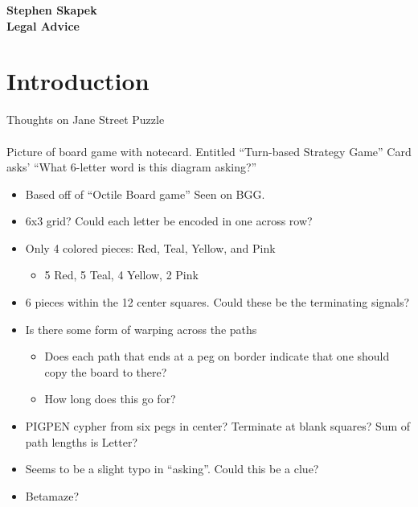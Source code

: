 \documentclass[11pt]{article}
\begin{document}
\begin{flushright}
\textbf{Stephen Skapek\\Legal Advice}
\end{flushright}
\section*{Introduction}
Thoughts on Jane Street Puzzle\\
\\
Picture of board game with notecard.
Entitled ``Turn-based Strategy Game''
Card asks' ``What 6-letter word is this diagram asking?''
\begin{itemize}
\item Based off of ``Octile Board game'' Seen on BGG.
\item 6x3 grid? Could each letter be encoded in one across row?
\item Only 4 colored pieces: Red, Teal, Yellow, and Pink
\begin{itemize}
\item 5 Red, 5 Teal, 4 Yellow, 2 Pink
\end{itemize}
\item 6 pieces within the 12 center squares. Could these be the terminating signals?
\item Is there some form of warping across the paths
\begin{itemize}
\item Does each path that ends at a peg on border indicate that one should copy the board to there?
\item How long does this go for?
\end{itemize}
\item PIGPEN cypher from six pegs in center? Terminate at blank squares? Sum of path lengths is Letter?
\item Seems to be a slight typo in ``asking''. Could this be a clue?
\item Betamaze?
\end{itemize}
\end{document}
